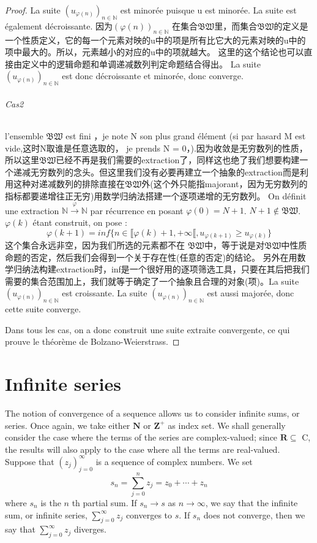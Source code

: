 \documentclass[12pt]{book}
\theoremstyle{definition}\newtheorem{dfn}{Définition}[chapter]
\theoremstyle{plain}\newtheorem{thm}{Théorème}[chapter]
\theoremstyle{plain}\newtheorem{prp}{Proposition}[chapter]
\theoremstyle{plain}\newtheorem{lem}{\bf Lemme}[chapter]
\theoremstyle{plain}\newtheorem{axm}{\bf Axiome}[chapter]
\theoremstyle{plain}\newtheorem{lmm}{\bf Lemme}[chapter]
\theoremstyle{plain}\newtheorem{exm}{\bf Example}[chapter]
\theoremstyle{plain}\newtheorem{cor}{\bf Corollaire}[chapter]
\theoremstyle{remark}\newtheorem{rem}{Remarque}[chapter]
\begin{document}
\begin{proof}
La suite $(u_{\varphi(n)})_{n\in \mathbb{N}}$ est minorée puisque u est minorée. La suite est également décroissante. 因为$(\varphi(n))_{n\in \mathbb{N}}$
在集合$\mathfrak{BW}$里，而集合$\mathfrak{BW}$的定义是一个性质定义，它的每一个元素对映的u中的项是所有比它大的元素对映的u中的项中最大的。所以，元素越小的对应的u中的项就越大。
这里的这个结论也可以直接由定义中的逻辑命题和单调递减数列判定命题结合得出。
La suite $(u_{\varphi(n)})_{n\in \mathbb{N}}$ est donc décroissante et minorée, donc converge.
\subparagraph{Cas2}
l’ensemble $\mathfrak{BW}$ est fini ，je note N son plus grand élément (si par hasard M est vide,这时N取谁是任意选取的， je prends N = 0，).因为收敛是无穷数列的性质，所以这里$\mathfrak{BW}$已经不再是我们需要的extraction了，同样这也绝了我们想要构建一个递减无穷数列的念头。但这里我们没有必要再建立一个抽象的extraction而是利用这种对递减数列的排除直接在$\mathfrak{BW}$外(这个外只能指majorant，因为无穷数列的指标都要递增往正无穷)用数学归纳法搭建一个逐项递增的无穷数列。 On définit une extraction
$\mathbb{N}\xrightarrow{\varphi} \mathbb{N}$ par récurrence en posant $\varphi(0)=N+1$. $N + 1 \notin \mathfrak{BW}$.
$\varphi(k)$ étant construit, on pose :
\begin{equation*}
\varphi(k+1)=inf\{n \in \llbracket \varphi(k)+1 , + \infty \llbracket
 ,u_{\varphi(k+1)} \ge u_{\varphi(k)} \}
\end{equation*}
这个集合永远非空，因为我们所选的元素都不在
$\mathfrak{BW}$中，等于说是对$\mathfrak{BW}$中性质命题的否定，然后我们会得到一个关于存在性(任意的否定)的结论。
另外在用数学归纳法构建extraction时，inf是一个很好用的逐项筛选工具，只要在其后把我们需要的集合范围加上，我们就等于确定了一个抽象且合理的对象(项)。La suite  $(u_{\varphi(n)})_{n\in \mathbb{N}}$  est croissante. La suite $(u_{\varphi(n)})_{n\in \mathbb{N}}$ est aussi majorée, donc cette suite converge.

Dans tous les cas, on a donc construit une suite extraite convergente, ce qui prouve le théorème de Bolzano-Weierstrass.
\end{proof}

\chapter{Infinite series}
The notion of convergence of a sequence allows us to consider infinite sums, or series. Once again, we take either $\mathbf{N}$ or $\mathbf{Z}^{+}$ as index set. We shall generally consider the case where the terms of the series are complex-valued; since $\mathbf{R} \subseteq$ C, the results will also apply to the case where all the terms are real-valued. Suppose that $\left(z_{j}\right)_{j=0}^{\infty}$ is a sequence of complex numbers. We set
$$
s_{n}=\sum_{j=0}^{n} z_{j}=z_{0}+\cdots+z_{n}
$$
where $s_{n}$ is the $n$ th partial sum. If $s_{n} \rightarrow s$ as $n \rightarrow \infty$, we say that the infinite sum, or infinite series, $\sum_{j=0}^{\infty} z_{j}$ converges to $s .$ If $s_{n}$ does not converge, then we say that $\sum_{j=0}^{\infty} z_{j}$ diverges.
\end{document}
